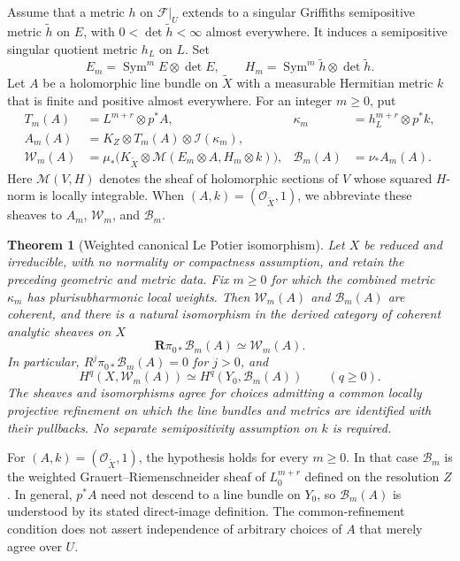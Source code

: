 \documentclass[11pt,reqno]{amsart}
\numberwithin{equation}{section}
\newtheorem{theorem}{Theorem}[section]
\theoremstyle{definition}
\theoremstyle{remark}
\newcommand{\OO}{\mathcal O}
\newcommand{\FF}{\mathcal F}
\newcommand{\MM}{\mathcal M}
\newcommand{\II}{\mathcal I}
\newcommand{\WW}{\mathcal W}
\newcommand{\BB}{\mathcal B}
\newcommand{\RR}{\mathbf R}
\newcommand{\Sym}{\operatorname{Sym}}
\begin{document}
Assume that a metric $h$ on $\FF|_U$ extends to a singular Griffiths semipositive metric $\widetilde h$ on $E$, with $0<\det\widetilde h<\infty$ almost everywhere. It induces a semipositive singular quotient metric $h_L$ on $L$. Set
\begin{equation}\label{eq:Em}
 E_m=\Sym^m E\otimes\det E,
 \qquad H_m=\Sym^m\widetilde h\otimes\det\widetilde h.
\end{equation}
Let $A$ be a holomorphic line bundle on $\widetilde X$ with a measurable Hermitian metric $k$ that is finite and positive almost everywhere. For an integer $m\geq0$, put
\begin{align}
 T_m(A)&=L^{m+r}\otimes p^*A,
 &\kappa_m&=h_L^{m+r}\otimes p^*k,\label{eq:combined-metric}\\
 A_m(A)&=K_Z\otimes T_m(A)\otimes\II(\kappa_m),\label{eq:Am}\\
 \WW_m(A)&=\mu_*\bigl(K_{\widetilde X}\otimes
                  \MM(E_m\otimes A,H_m\otimes k)\bigr),
 &\BB_m(A)&=\nu_*A_m(A).\label{eq:WB}
\end{align}
Here $\MM(V,H)$ denotes the sheaf of holomorphic sections of $V$ whose squared $H$-norm is locally integrable. When $(A,k)=(\OO_{\widetilde X},1)$, we abbreviate these sheaves to $A_m$, $\WW_m$, and $\BB_m$.

\begin{theorem}[Weighted canonical Le Potier isomorphism]\label{thm:main}
Let $X$ be reduced and irreducible, with no normality or compactness assumption, and retain the preceding geometric and metric data. Fix $m\geq0$ for which the combined metric $\kappa_m$ has plurisubharmonic local weights. Then $\WW_m(A)$ and $\BB_m(A)$ are coherent, and there is a natural isomorphism in the derived category of coherent analytic sheaves on $X$
\begin{equation}\label{eq:main-derived}
 \RR\pi_{0*}\BB_m(A)\simeq\WW_m(A).
\end{equation}
In particular, $R^j\pi_{0*}\BB_m(A)=0$ for $j>0$, and
\begin{equation}\label{eq:main-cohom}
 H^q(X,\WW_m(A))\simeq H^q(Y_0,\BB_m(A))
 \qquad(q\geq0).
\end{equation}
The sheaves and isomorphisms agree for choices admitting a common locally projective refinement on which the line bundles and metrics are identified with their pullbacks. No separate semipositivity assumption on $k$ is required.
\end{theorem}

For $(A,k)=(\OO_{\widetilde X},1)$, the hypothesis holds for every $m\geq0$. In that case $\BB_m$ is the weighted Grauert--Riemenschneider sheaf of $L_0^{m+r}$ defined on the resolution $Z$. In general, $p^*A$ need not descend to a line bundle on $Y_0$, so $\BB_m(A)$ is understood by its stated direct-image definition. The common-refinement condition does not assert independence of arbitrary choices of $A$ that merely agree over $U$.
\end{document}
